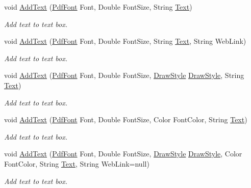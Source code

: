 \begin{DoxyCompactItemize}
void \hyperlink{class_pdf_file_writer_1_1_text_box_ae3dd1c18749b3d16fcc4b293a0fa820e}{Add\+Text} (\hyperlink{class_pdf_file_writer_1_1_pdf_font}{Pdf\+Font} Font, Double Font\+Size, String \hyperlink{namespace_pdf_file_writer_a45e52c090a4d8e1333577773ec0bac4aa9dffbf69ffba8bc38bc4e01abf4b1675}{Text})
\begin{DoxyCompactList}\small\item\em Add text to text box. \end{DoxyCompactList}\item 
void \hyperlink{class_pdf_file_writer_1_1_text_box_af45a1b042ffd491fd1393f64e96e4b7a}{Add\+Text} (\hyperlink{class_pdf_file_writer_1_1_pdf_font}{Pdf\+Font} Font, Double Font\+Size, String \hyperlink{namespace_pdf_file_writer_a45e52c090a4d8e1333577773ec0bac4aa9dffbf69ffba8bc38bc4e01abf4b1675}{Text}, String Web\+Link)
\begin{DoxyCompactList}\small\item\em Add text to text box. \end{DoxyCompactList}\item 
void \hyperlink{class_pdf_file_writer_1_1_text_box_a24e04133389eedbfd855046ec69c43dc}{Add\+Text} (\hyperlink{class_pdf_file_writer_1_1_pdf_font}{Pdf\+Font} Font, Double Font\+Size, \hyperlink{namespace_pdf_file_writer_a2bcdd73c6cedab15d6f6c2a64333ef39}{Draw\+Style} \hyperlink{namespace_pdf_file_writer_a2bcdd73c6cedab15d6f6c2a64333ef39}{Draw\+Style}, String \hyperlink{namespace_pdf_file_writer_a45e52c090a4d8e1333577773ec0bac4aa9dffbf69ffba8bc38bc4e01abf4b1675}{Text})
\begin{DoxyCompactList}\small\item\em Add text to text box. \end{DoxyCompactList}\item 
void \hyperlink{class_pdf_file_writer_1_1_text_box_a293b85cc467cc5d1e7993bbad1bffa01}{Add\+Text} (\hyperlink{class_pdf_file_writer_1_1_pdf_font}{Pdf\+Font} Font, Double Font\+Size, Color Font\+Color, String \hyperlink{namespace_pdf_file_writer_a45e52c090a4d8e1333577773ec0bac4aa9dffbf69ffba8bc38bc4e01abf4b1675}{Text})
\begin{DoxyCompactList}\small\item\em Add text to text box. \end{DoxyCompactList}\item 
void \hyperlink{class_pdf_file_writer_1_1_text_box_a0bc233ba14e32b7c4c9e4352250cbb45}{Add\+Text} (\hyperlink{class_pdf_file_writer_1_1_pdf_font}{Pdf\+Font} Font, Double Font\+Size, \hyperlink{namespace_pdf_file_writer_a2bcdd73c6cedab15d6f6c2a64333ef39}{Draw\+Style} \hyperlink{namespace_pdf_file_writer_a2bcdd73c6cedab15d6f6c2a64333ef39}{Draw\+Style}, Color Font\+Color, String \hyperlink{namespace_pdf_file_writer_a45e52c090a4d8e1333577773ec0bac4aa9dffbf69ffba8bc38bc4e01abf4b1675}{Text}, String Web\+Link=null)
\begin{DoxyCompactList}\small\item\em Add text to text box. \end{DoxyCompactList}\end{DoxyCompactItemize}
